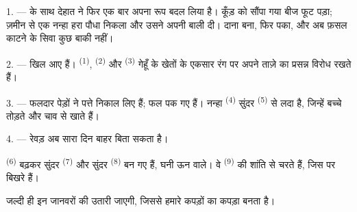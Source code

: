 %


\VUsaut{5.0mm}
\VUsaut{3.0mm}
\VUsaut{3.0mm}
\VUsaut{4.0mm}
\VUsaut{3.0mm}

1. ---  के साथ देहात ने फिर एक बार अपना रूप बदल लिया है। कूँड़ को
सौंपा गया बीज फूट पड़ा; ज़मीन से एक नन्हा हरा पौधा निकला और उसने अपनी बाली दी।
दाना बना, फिर पका, और अब फ़सल काटने के सिवा कुछ बाकी नहीं।

2. ---  खिल आए हैं।  \textsuperscript{(1)},
 \textsuperscript{(2)} और 
\textsuperscript{(3)} गेहूँ के खेतों के एकसार रंग पर अपने ताज़े 
का प्रसन्न विरोध रखते हैं।

3. --- फलदार पेड़ों ने पत्ते निकाल लिए हैं; फल पक गए हैं। नन्हा
 \textsuperscript{(4)} सुंदर 
\textsuperscript{(5)} से लदा है, जिन्हें बच्चे तोड़ते और चाव से खाते हैं।

4. --- रेवड़ अब सारा दिन बाहर बिता सकता है।

 \textsuperscript{(6)} बढ़कर सुंदर 
\textsuperscript{(7)} और सुंदर  \textsuperscript{(8)} बन गए हैं,
घनी ऊन वाले। वे  \textsuperscript{(9)} की  शांति से
चरते हैं, जिस पर  बिखरे हैं।

जल्दी ही इन जानवरों की  उतारी जाएगी, जिससे हमारे कपड़ों का कपड़ा बनता
है।

\VUsaut{5.0mm}
\VUsaut{3.4mm}

